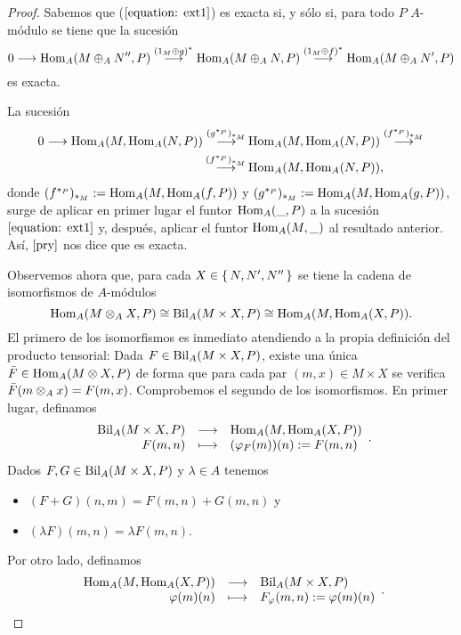 \documentclass[../main.tex]{subfiles}
\begin{document}
\begin{proof}
	Sabemos que ($\ref{equation: ext1}$) es exacta si, y sólo si, para todo $P$ $A$-módulo se tiene que la sucesión
	\begin{equation}\label{equation: ext3}
	0\longrightarrow\operatorname{Hom}_A(M\oplus_A N'',P)\overset{(1_M\oplus g)^*}{\longrightarrow}\operatorname{Hom}_A(M\oplus_A N,P)\overset{(1_M\oplus f)^*}{\longrightarrow}\operatorname{Hom}_A(M\oplus_A N',P)
	\end{equation}
	es exacta.
	
	La sucesión
	\begin{align*}\label{equation: ext4}
	0\longrightarrow\operatorname{Hom}_A(M,\operatorname{Hom}_A(N,P))\overset{(g^{*_P})_{*_M}}{\longrightarrow}&\operatorname{Hom}_A(M,\operatorname{Hom}_A(N,P))\overset{(f^{*_P})_{*_M}}{\longrightarrow}\\
	\overset{(f^{*_P})_{*_M}}{\longrightarrow}&\operatorname{Hom}_A(M,\operatorname{Hom}_A(N,P)),
	\end{align*}
	donde $(f^{*_P})_{*_M}:=\operatorname{Hom}_A(M,\operatorname{Hom}_A(f,P))$ y $(g^{*_P})_{*_M}:=\operatorname{Hom}_A(M,\operatorname{Hom}_A(g,P))$, surge de aplicar en primer lugar el funtor $\operatorname{Hom}_A(\_,P)$ a la sucesión $\ref{equation: ext1}$ y, después, aplicar el funtor $\operatorname{Hom}_A(M,\_)$ al resultado anterior. Así, $\ref{pry}$ nos dice que es exacta.
	
	Observemos ahora que, para cada $X\in\set{N,N',N''}$ se tiene la cadena de isomorfismos de $A$-módulos
	$$\operatorname{Hom}_A(M\otimes_A X,P)\cong\operatorname{Bil}_A(M\times X,P)\cong\operatorname{Hom}_A(M,\operatorname{Hom}_A(X,P)).$$
	El primero de los isomorfismos es inmediato atendiendo a la propia definición del producto tensorial: Dada $F\in\operatorname{Bil}_A(M\times X,P)$, existe una única $\Bar{F}\in\operatorname{Hom}_A(M\otimes X,P)$ de forma que para cada par $(m,x)\in M\times X$ se verifica $\Bar{F}(m\otimes_A x)=F(m,x)$. Comprobemos el segundo de los isomorfismos. En primer lugar, definamos
	$$\begin{array}{rcl}
	\operatorname{Bil}_A(M\times X,P)&\longrightarrow&\operatorname{Hom}_A(M,\operatorname{Hom}_A(X,P))\\
	F(m,n)&\longmapsto&(\varphi_F(m))(n):=F(m,n)
	\end{array}.$$
	Dados $F,G\in\operatorname{Bil}_A(M\times X,P)$ y $\lambda\in A$ tenemos
	\begin{itemize}
		\item $(F+G)(n,m)=F(m,n)+G(m,n)$ y
		\item $(\lambda F)(m,n)=\lambda F(m,n).$
	\end{itemize}
	
	Por otro lado, definamos
	$$\begin{array}{rcl}
	\operatorname{Hom}_A(M,\operatorname{Hom}_A(X,P))&\longrightarrow&\operatorname{Bil}_A(M\times X,P)\\
	\varphi(m)(n)&\longmapsto&F_\varphi(m,n):=\varphi(m)(n)
	\end{array}.$$
	

\end{proof}
\end{document}
